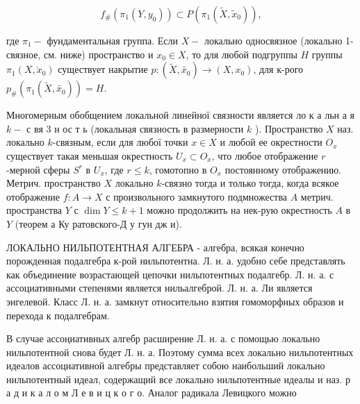 \documentclass[10pt]{article}
\begin{document}
\[

f_{\#}\left(\pi_{1}\left(Y, y_{0}\right)\right) \subset P\left(\pi_{1}\left(\tilde{X}, \tilde{x}_{0}\right)\right),

\]



где $\pi_{1}-$ фундаментальная группа. Если $X-$ локально односвязное (локально 1-связное, см. ниже) пространство и $x_{0} \in X$, то для любой подгруппы $H$ группы $\pi_{1}\left(X, \grave{x}_{0}\right)$ существует накрытие $p:\left(\tilde{X}, \tilde{x_{0}}\right) \rightarrow\left(X, x_{0}\right)$, для к-рого $p_{\#}\left(\pi_{1}\left(\tilde{X}, \tilde{x_{0}}\right)\right)=H$.



Многомерным обобщением локальной линейної связности является ло к а льн а я $k-$ с вя 3 н ос т ь (локальная связность в размерности $k$ ). Пространство $X$ наз. локально $k$-связным, если для любої точки $x \in X$ и любой ее окрестности $O_{x}$ существует такая меньшая окрестность $U_{x} \subset O_{x}$, что любое отображение $r$-мерной сферы $S^{r}$ в $U_{x}$, где $r \leqslant k$, гомотопно в $O_{x}$ постоянному отображению. Метрич. пространство $X$ локально $k$-связно тогда и только тогда, когда всякое отображение $f: A \rightarrow X$ с произвольного замкнутого подмножества $A$ метрич. пространства $Y$ с $\operatorname{dim} Y \leqslant k+1$ можно продолжить на нек-рую окрестность $A$ в $Y$ (теорем а Ку ратовского-Д у гун дж и).



ЛОКАЛЬНО НИЛЬПОТЕНТНАЯ АЛГЕБРА - алгебра, всякая конечно порожденная подалгебра к-рой нильпотентна. Л. н. а. удобно себе представлять как объединение возрастающей цепочки нильпотентных подалгебр. Л. н. а. с ассоциативными степенями является нильалгеброй. Л. н. а. Ли является энгелевой. Класс Л. н. а. замкнут относительно взятия гомоморфных образов и перехода к подалгебрам.



В случае ассоңиативных алгебр расширение Л. н. а. с помощью локально нильпотентной снова будет Л. н. а. Поэтому сумма всех локально нильпотентных идеалов ассоциативной алгебры представляет собою наибольший локально нильпотентный идеал, содержащий все локально нильпотентные идеалы и наз. р а д и к а л о м Л е в и ц к о г о. Аналог радикала Левицкого можно
\end{document}
